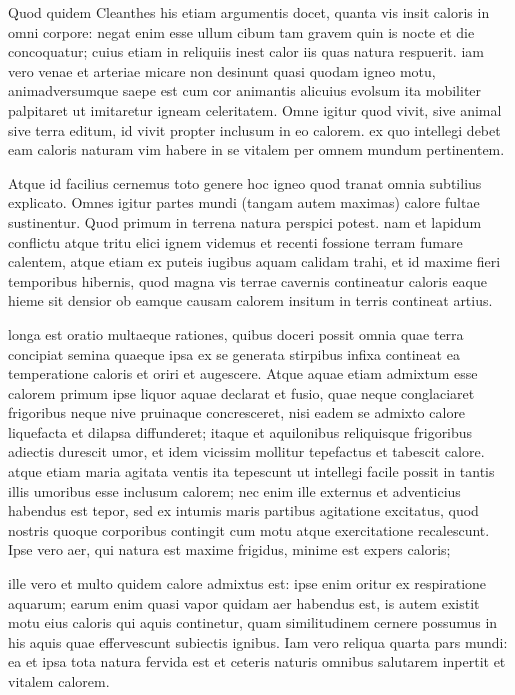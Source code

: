  Quod quidem Cleanthes his etiam argumentis docet, quanta vis insit caloris in omni corpore: negat enim esse ullum cibum tam gravem quin is nocte et die concoquatur; cuius etiam in reliquiis inest calor iis quas natura respuerit. iam vero venae et arteriae micare non desinunt quasi quodam igneo motu, animadversumque saepe est cum cor animantis alicuius evolsum ita mobiliter palpitaret ut imitaretur igneam celeritatem. Omne igitur quod vivit, sive animal sive terra editum, id vivit propter inclusum in eo calorem. ex quo intellegi debet eam caloris naturam vim habere in se vitalem per omnem mundum pertinentem.

 Atque id facilius cernemus toto genere hoc igneo quod tranat omnia subtilius explicato. Omnes igitur partes mundi (tangam autem maximas) calore fultae sustinentur. Quod primum in terrena natura perspici potest. nam et lapidum conflictu atque tritu elici ignem videmus et recenti fossione terram fumare calentem, atque etiam ex puteis iugibus aquam calidam trahi, et id maxime fieri temporibus hibernis, quod magna vis terrae cavernis contineatur caloris eaque hieme sit densior ob eamque causam calorem insitum in terris contineat artius.

 longa est oratio multaeque rationes, quibus doceri possit omnia quae terra concipiat semina quaeque ipsa ex se generata stirpibus infixa contineat ea temperatione caloris et oriri et augescere. Atque aquae etiam admixtum esse calorem primum ipse liquor aquae declarat et fusio, quae neque conglaciaret frigoribus neque nive pruinaque concresceret, nisi eadem se admixto calore liquefacta et dilapsa diffunderet; itaque et aquilonibus reliquisque frigoribus adiectis durescit umor, et idem vicissim mollitur tepefactus et tabescit calore. atque etiam maria agitata ventis ita tepescunt ut intellegi facile possit in tantis illis umoribus esse inclusum calorem; nec enim ille externus et adventicius habendus est tepor, sed ex intumis maris partibus agitatione excitatus, quod nostris quoque corporibus contingit cum motu atque exercitatione recalescunt. Ipse vero aer, qui natura est maxime frigidus, minime est expers caloris;

 ille vero et multo quidem calore admixtus est: ipse enim oritur ex respiratione aquarum; earum enim quasi vapor quidam aer habendus est, is autem existit motu eius caloris qui aquis continetur, quam similitudinem cernere possumus in his aquis quae effervescunt subiectis ignibus. Iam vero reliqua quarta pars mundi: ea et ipsa tota natura fervida est et ceteris naturis omnibus salutarem inpertit et vitalem calorem.

